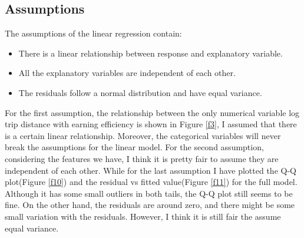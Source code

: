 \documentclass[11pt]{article}
\begin{document}
\subsection{Assumptions}
The assumptions of the linear regression contain: 
\begin{itemize}
\item There is a linear relationship between response and explanatory variable.
\item All the explanatory variables are independent of each other.
\item The residuals follow a normal distribution and have equal variance.
\end{itemize}
For the first assumption, the relationship between the only numerical variable log trip distance with earning efficiency is shown in Figure \ref{f3}, I assumed that there is a certain linear relationship. Moreover, the categorical variables will never break the assumptions for the linear model. For the second assumption, considering the features we have, I think it is pretty fair to assume they are independent of each other. While for the last assumption I have plotted the Q-Q plot(Figure \ref{f10}) and the residual vs fitted value(Figure \ref{f11}) for the full model. Although it has some small outliers in both tails, the Q-Q plot still seems to be fine. On the other hand, the residuals are around zero, and there might be some small variation with the residuals. However, I think it is still fair the assume equal variance.
\end{document}
